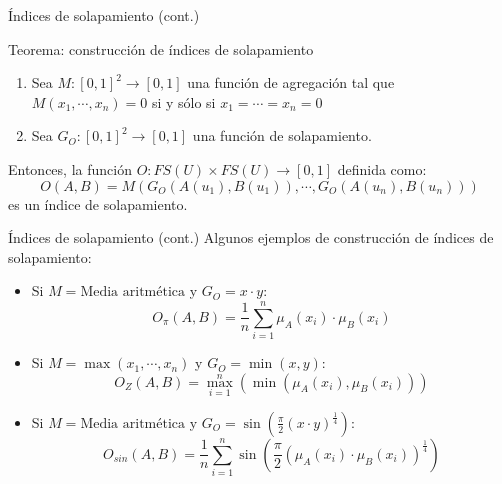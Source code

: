 \documentclass{beamer}
\begin{document}
\begin{frame}{Índices de solapamiento (cont.)}
	\begin{block}{Teorema: construcción de índices de solapamiento}
		\begin{enumerate}
			\item Sea $M : [0,1]^{2} \rightarrow [0,1]$ una función de agregación tal que $M(x_{1},\cdots,x_{n}) = 0$ si y sólo si $x_{1} = \cdots = x_{n} = 0$
			\item Sea $G_{O} : [0,1]^{2} \rightarrow [0,1]$ una función de solapamiento.
		\end{enumerate}
		Entonces, la función $O: FS(U) \times FS(U) \rightarrow [0,1]$ definida como:
		\begin{equation}
		O(A,B) = M(G_{O}(A(u_{1}),B(u_{1})),\cdots,G_{O}(A(u_{n}),B(u_{n})))
		\end{equation}
		es un índice de solapamiento.
	\end{block}
\end{frame}

\begin{frame}{Índices de solapamiento (cont.)}
Algunos ejemplos de construcción de índices de solapamiento:
\begin{itemize}
	\item Si $M = \text{Media aritmética}$ y $G_O = x \cdot y$:
	\begin{equation}
	O_{\pi}(A,B) = \frac{1}{n}\sum_{i=1}^{n}\mu_A(x_i) \cdot \mu_B(x_i)
	\end{equation}
	\item Si $M = \max(x_1,\cdots,x_n)$ y $G_O = \min(x,y)$:
	\begin{equation}
	O_{Z}(A,B) = \max\limits_{i=1}^{n}(\min(\mu_A(x_i),\mu_B(x_i)))
	\end{equation}
	\item Si $M = \text{Media aritmética}$ y $G_O = \sin(\frac{\pi}{2}(x \cdot y)^{\frac{1}{4}})$:
	\begin{equation}
	O_{sin}(A, B) = \frac{1}{n}\sum_{i=1}^{n}\sin(\frac{\pi}{2}(\mu_A(x_i) \cdot \mu_B(x_i))^{\frac{1}{4}})
	\end{equation}
\end{itemize}
\end{frame}
\end{document}
